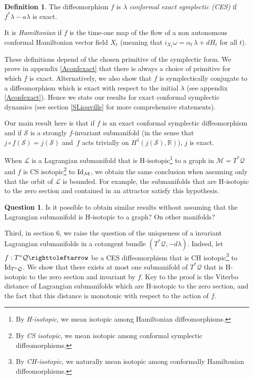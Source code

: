 \documentclass[JEP,XML,SOM,Unicode,published]{cedram}
\theoremstyle{definition}
\newtheorem{definition}[theorem]{Definition}
\newtheorem*{question*}{Question}
\def\R{\mathbb{R}}
\def\cL{{\mathcal L}}
\def\cM{{\mathcal M}}
\def\cQ{{\mathcal Q}}
\def\cS{{\mathcal S}}
\begin{document}
\begin{definition}
The diffeomorphism $f$ is \emph{$\lambda$ conformal exact symplectic (CES)} if $f^*\lambda-a\lambda$ is exact.

It is \emph{Hamiltonian} if $f$ is the time-one map of the flow of a non autonomous conformal Hamiltonian vector field $X_t$ (meaning that $i_{X_t}\omega = \alpha_t \, \lambda + dH_t$ for all $t$).
\end{definition}

These definitions depend of the chosen primitive of the symplectic form. We prove in appendix \ref{Aconfexact} that there is always a choice of primitive for which $f$ is exact. Alternatively, we also show that $f$ is symplectically conjugate to a diffeomorphism which is exact with respect to the initial $\lambda$ (see appendix \ref{Aconfexact}). Hence we state our results for exact conformal symplectic dynamics (see section \ref{SLiouville} for more comprehensive statements).

Our main result here is that if $f$ is an exact conformal symplectic diffeomorphism and if $\cS$ is a strongly $f$-invariant submanifold (in the sense that $j \circ f (\cS) = j(\cS)$ and~$f$ acts trivially on $H^1(j(\cS),\R)$), $j$ is exact.

When $\cL$ is a Lagrangian submanifold that is H-isotopic\footnote{By \emph{H-isotopic}, we mean isotopic among Hamiltonian diffeomorphisms.} to a graph in $\cM=T^*\cQ$ and $f$ is CS isotopic\footnote{By {\sl CS isotopic}, we mean isotopic among conformal symplectic diffeomorphisms.} to ${\rm Id}_\cM$, we obtain the same conclusion when assuming only that the orbit of $\cL$ is bounded. For example, the submanifolds that are H-isotopic to the zero section and contained in an attractor satisfy this hypothesis.

\begin{question*}
Is it possible to obtain similar results without assuming that the Lagrangian submanifold is H-isotopic to a graph? On other manifolds?
\end{question*}

Third, in section 6, we raise the question of the uniqueness of a invariant Lagrangian submanifolds in a cotangent bundle $(T^*\cQ, -d\lambda)$. Indeed, let $f:T^*\cQ \righttoleftarrow$ be a CES diffeomorphism that is CH isotopic\footnote{By \emph{CH-isotopic}, we naturally mean isotopic among conformally Hamiltonian diffeomorphisms.} to ${\rm Id}_{T^*\cQ}$. We show that there exists at most one submanifold of $T^*\cQ$ that is H-isotopic to the zero section and invariant by $f$. Key to the proof is the Viterbo distance of Lagrangian submanifolds which are H-isotopic to the zero section, and the fact that this distance is monotonic with respect to the action of $f$.
\end{document}

